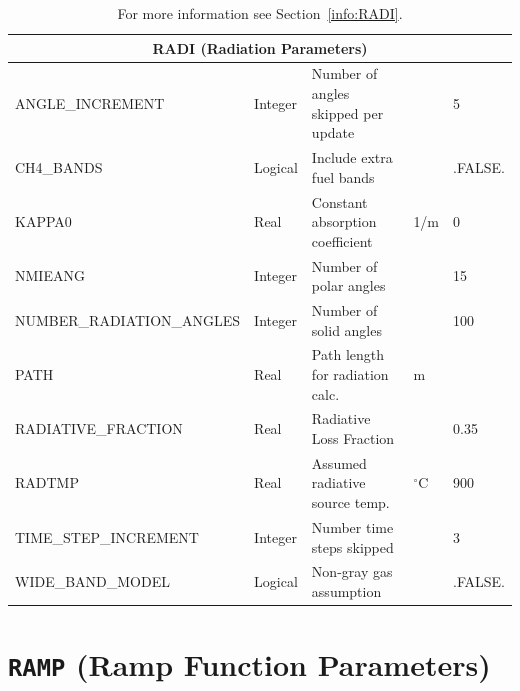 \documentclass[11pt]{book}
\begin{document}
\hspace{1in}

\begin{table}[H]
\caption{For more information see Section~\ref{info:RADI}.}\label{tbl:RADI}
\noindent
\begin{tabular*}{\textwidth}{@{\extracolsep{\fill}}|l|l|l|l|l|}
\hline
\multicolumn{5}{|c|}{{\ct RADI} (Radiation Parameters)} \\ \hline \hline
{\ct ANGLE\_INCREMENT}          & Integer  & Number of angles skipped per update &                   & 5    \\ \hline
{\ct CH4\_BANDS          }      & Logical  & Include extra fuel bands            &                   & {\ct .FALSE.} \\ \hline
{\ct KAPPA0                   } & Real     & Constant absorption coefficient     & 1/m               & 0      \\ \hline
{\ct NMIEANG                  } & Integer  & Number of polar angles              &                   & 15     \\ \hline
{\ct NUMBER\_RADIATION\_ANGLES} & Integer  & Number of solid angles              &                   & 100    \\ \hline
{\ct PATH                     } & Real     & Path length for radiation calc.     &   m               &        \\ \hline
{\ct RADIATIVE\_FRACTION}       & Real     & Radiative Loss Fraction             &                   & 0.35    \\ \hline
{\ct RADTMP                   } & Real     & Assumed radiative source temp.      & $^\circ$C         & 900    \\ \hline
{\ct TIME\_STEP\_INCREMENT}     & Integer  & Number time steps skipped           &                   & 3    \\ \hline
{\ct WIDE\_BAND\_MODEL    }     & Logical  & Non-gray gas assumption             &                   & {\ct .FALSE.} \\ \hline
\end{tabular*}
\end{table}

\vspace{\baselineskip}

\vfill

\section{\texorpdfstring{{\tt RAMP}}{RAMP} (Ramp Function Parameters)}
\end{document}
